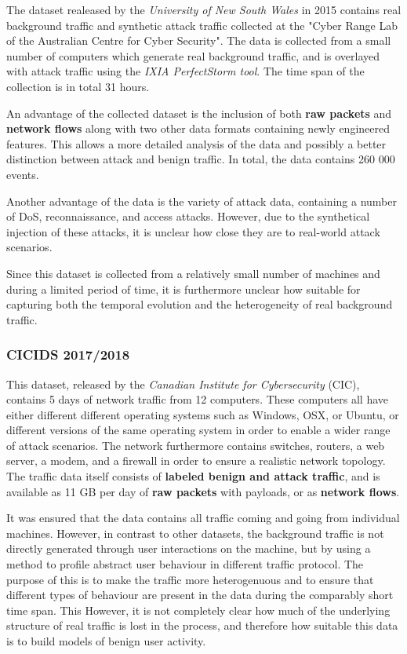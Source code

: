 The dataset realeased by the \textit{University of New South Wales} in 2015 contains real background traffic and synthetic attack traffic collected at the "Cyber Range Lab of the Australian Centre for Cyber Security". The data is collected from a small number of computers which generate real background traffic, and is overlayed with attack traffic using the \textit{IXIA PerfectStorm tool}. The time span of the collection is in total 31 hours.

An advantage of the collected dataset is the inclusion of both \textbf{raw packets} and \textbf{network flows} along with two other data formats containing newly engineered features. This allows a more detailed analysis of the data and possibly a better distinction between attack and benign traffic. In total, the data contains 260 000 events.

Another advantage of the data is the variety of attack data, containing a number of DoS, reconnaissance, and access attacks. However, due to the synthetical injection of these attacks, it is unclear how close they are to real-world attack scenarios.

Since this dataset is collected from a relatively small number of machines and during a limited period of time, it is furthermore unclear how suitable for capturing both the temporal evolution and the heterogeneity of real background traffic.

\subsubsection*{CICIDS 2017/2018 \cite{gharib2016evaluation}\cite{sharafaldin2018towards}}

This dataset, released by the \textit{Canadian Institute for Cybersecurity} (CIC), contains 5 days of network traffic from 12 computers. These computers all have either different different operating systems such as Windows, OSX, or Ubuntu, or different versions of the same operating system in order to enable a wider range of attack scenarios. The network  furthermore contains switches, routers, a web server, a modem, and a firewall in order to ensure a realistic network topology. The traffic data itself consists of \textbf{labeled benign and attack traffic}, and is available as 11 GB per day of \textbf{raw packets} with payloads, or as \textbf{network flows}. 

It was ensured that the data contains all traffic coming and going from individual machines. However, in contrast to other datasets, the background traffic is not directly generated through user interactions on the machine, but by using a method to profile abstract user behaviour in different traffic protocol. The purpose of this is to make the traffic more heterogenuous and to ensure that different types of behaviour are present in the data during the comparably short time span. This  However, it is not completely clear how much of the underlying structure of real traffic is lost in the process, and therefore how suitable this data is to build models of benign user activity.

